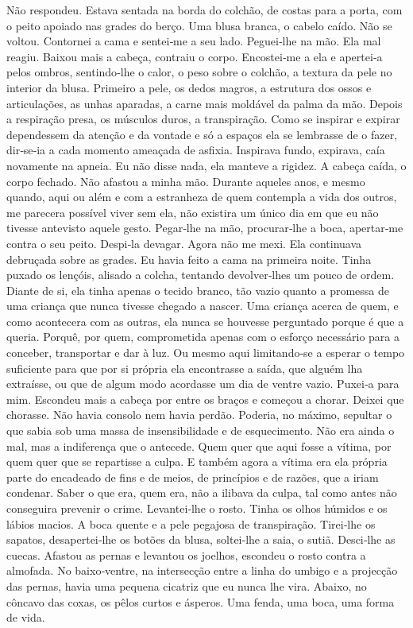 Não respondeu. Estava sentada na borda do colchão, de costas para a
porta, com o peito apoiado nas grades do berço. Uma blusa branca, o
cabelo caído. Não se voltou. Contornei a cama e sentei­‑me a seu lado.
Peguei­‑lhe na mão. Ela mal reagiu. Baixou mais a cabeça, contraiu o
corpo. Encostei­‑me a ela e apertei­‑a pelos ombros, sentindo­‑lhe o
calor, o peso sobre o colchão, a textura da pele no interior da blusa.
Primeiro a pele, os dedos magros, a estrutura dos ossos e articulações,
as unhas aparadas, a carne mais moldável da palma da mão. Depois a
respiração presa, os músculos duros, a transpiração. Como se inspirar e
expirar dependessem da atenção e da vontade e só a espaços ela se
lembrasse de o fazer, dir­‑se­‑ia a cada momento ameaçada de asfixia.
Inspirava fundo, expirava, caía novamente na apneia. Eu não disse nada,
ela manteve a rigidez. A cabeça caída, o corpo fechado. Não afastou a
minha mão. Durante aqueles anos, e mesmo quando, aqui ou além e com a
estranheza de quem contempla a vida dos outros, me parecera possível
viver sem ela, não existira um único dia em que eu não tivesse antevisto
aquele gesto. Pegar­‑lhe na mão, procurar­‑lhe a boca, apertar­‑me
contra o seu peito. Despi­‑la devagar. Agora não me mexi. Ela continuava
debruçada sobre as grades. Eu havia feito a cama na primeira noite.
Tinha puxado os lençóis, alisado a colcha, tentando devolver­‑lhes um
pouco de ordem. Diante de si, ela tinha apenas o tecido branco, tão
vazio quanto a promessa de uma criança que nunca tivesse chegado a
nascer. Uma criança acerca de quem, e como acontecera com as outras, ela
nunca se houvesse perguntado porque é que a queria. Porquê, por quem,
comprometida apenas com o esforço necessário para a conceber,
transportar e dar à luz. Ou mesmo aqui limitando­‑se a esperar o tempo
suficiente para que por si própria ela encontrasse a saída, que alguém
lha extraísse, ou que de algum modo acordasse um dia de ventre vazio.
Puxei­‑a para mim. Escondeu mais a cabeça por entre os braços e começou
a chorar. Deixei que chorasse. Não havia consolo nem havia perdão.
Poderia, no máximo, sepultar o que sabia sob uma massa de
insensibilidade e de esquecimento. Não era ainda o mal, mas a
indiferença que o antecede. Quem quer que aqui fosse a vítima, por quem
quer que se repartisse a culpa. E também agora a vítima era ela própria
parte do encadeado de fins e de meios, de princípios e de razões, que a
iriam condenar. Saber o que era, quem era, não a ilibava da culpa, tal
como antes não conseguira prevenir o crime. Levantei­‑lhe o rosto. Tinha
os olhos húmidos e os lábios macios. A boca quente e a pele pegajosa de
transpiração. Tirei­‑lhe os sapatos, desapertei­‑lhe os botões da blusa,
soltei­‑lhe a saia, o sutiã. Desci­‑lhe as cuecas. Afastou as pernas e
levantou os joelhos, escondeu o rosto contra a almofada. No
baixo­‑ventre, na intersecção entre a linha do umbigo e a projecção das
pernas, havia uma pequena cicatriz que eu nunca lhe vira. Abaixo, no
côncavo das coxas, os pêlos curtos e ásperos. Uma fenda, uma boca, uma
forma de vida.

